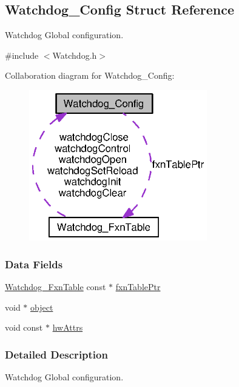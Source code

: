 \subsection{Watchdog\+\_\+\+Config Struct Reference}
\label{struct_watchdog___config}


Watchdog Global configuration.  




{\ttfamily \#include $<$Watchdog.\+h$>$}



Collaboration diagram for Watchdog\+\_\+\+Config\+:
\nopagebreak
\begin{figure}[H]
\begin{center}
\leavevmode
\includegraphics[width=220pt]{struct_watchdog___config__coll__graph}
\end{center}
\end{figure}
\subsubsection*{Data Fields}
\begin{DoxyCompactItemize}
\item 
\hyperlink{struct_watchdog___fxn_table}{Watchdog\+\_\+\+Fxn\+Table} const $\ast$ \hyperlink{struct_watchdog___config_a89184eb9474db817513b06dfd86bf96f}{fxn\+Table\+Ptr}
\item 
void $\ast$ \hyperlink{struct_watchdog___config_aa8602245e364f7f910255dbcb14f51d1}{object}
\item 
void const $\ast$ \hyperlink{struct_watchdog___config_a96131766bd4da7bc2239eed02f15bed0}{hw\+Attrs}
\end{DoxyCompactItemize}


\subsubsection{Detailed Description}
Watchdog Global configuration. 

